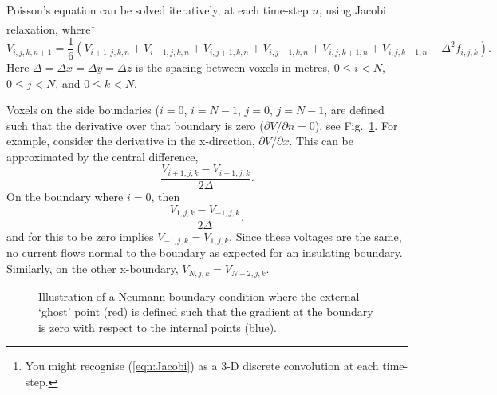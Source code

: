 \documentclass[a4paper,11pt]{article}
\begin{document}
Poisson's equation can be solved iteratively, at each time-step $n$,
using Jacobi relaxation, where\footnote{You might recognise
  (\ref{eqn:Jacobi}) as a 3-D discrete convolution at each time-step.}
%
\begin{equation}
  V_{i,j,k,n+1} = \frac{1}{6} \left(V_{i+1,j,k,n} + V_{i-1,j,k,n} + V_{i,j+1,k,n} + V_{i,j-1,k,n} + V_{i,j,k+1,n} + V_{i,j,k-1,n} - \Delta^2 f_{i,j,k}\right).
\label{eqn:Jacobi}
\end{equation}
%
Here $\Delta = \Delta x = \Delta y = \Delta z$ is the spacing between
voxels in metres, $0 \le i < N$, $0 \le j < N$, and $0 \le k < N$.

Voxels on the side boundaries ($i = 0$, $i=N-1$, $j = 0$, $j=N-1$, are
defined such that the derivative over that boundary is zero ($\partial
V / \partial n = 0$), see Fig.~\ref{fig:Boundary}.  For example,
consider the derivative in the x-direction, $\partial V / \partial x$.
This can be approximated by the central difference,
%
\begin{equation}
  \frac{V_{i+1,j,k} - V_{i-1,j,k}}{2\Delta}.
\end{equation}
%
On the boundary where $i=0$, then
%
\begin{equation}
  \frac{V_{1,j,k} - V_{-1,j,k}}{2\Delta},
\end{equation}
%
and for this to be zero implies $V_{-1,j,k} = V_{1,j,k}$.  Since these
voltages are the same, no current flows normal to the boundary as
expected for an insulating boundary.  Similarly, on the other
x-boundary, $V_{N,j,k} = V_{N-2,j,k}$.


\begin{figure}
  \centering
  \caption{Illustration of a Neumann boundary condition where the external
  `ghost' point (red) is defined such that the gradient at the boundary is zero
  with respect to the internal points (blue).}
  \label{fig:Boundary}
\end{figure}
\end{document}
